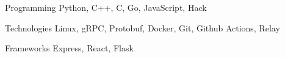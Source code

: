 

\begin{cvskills}

  \cvskill
  {Programming} %
  {Python, C++, C, Go, JavaScript, Hack} %

  \cvskill
  {Technologies} %
  {Linux, gRPC, Protobuf, Docker, Git, Github Actions, Relay} %

  \cvskill
  {Frameworks} %
  {Express, React, Flask} %

\end{cvskills}
